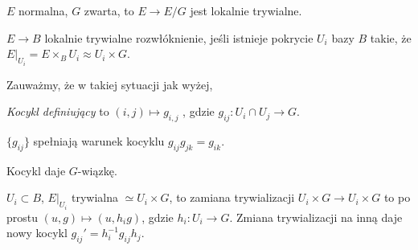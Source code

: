  \begin{twierdzeniebd}
  $E$ normalna, $G$ zwarta, to $E \to E/G$ jest lokalnie trywialne.
 \end{twierdzeniebd}
 
 \begin{definicja}
  $E \to B$ lokalnie trywialne rozwłóknienie, jeśli istnieje pokrycie $U_i$ bazy $B$ takie, że $E|_{U_i} = E \times_B U_i \approx U_i \times G$.
 \end{definicja}
 
 \begin{uwaga}
  Zauważmy, że w takiej sytuacji jak wyżej,
  

 \end{uwaga}
 
 \begin{definicja}
  \emph{Kocykl definiujący} to $(i,j) \mapsto g_{i,j}$ , gdzie $g_{ij}:U_i \cap U_j \to G$.
 \end{definicja}
 
 \begin{stwierdzenie}
  $\{g_{ij}\}$ spełniają warunek kocyklu $g_{ij} g_{jk} = g_{ik}$.
 \end{stwierdzenie}
 
 \begin{uwaga}
  Kocykl daje $G$-wiązkę.
 \end{uwaga}
 
 \begin{uwaga}
  $U_i \subset B$, $E|_{U_i}$ trywialna $\simeq U_i \times G$, to zamiana trywializacji $U_i \times G \to U_i \times G$ to po prostu $(u,g) \mapsto (u,h_i g)$, gdzie $h_i:U_i \to G$. Zmiana trywializacji na inną daje nowy kocykl $g_{ij}' = h_i^{-1} g_{ij} h_j$.
 \end{uwaga}
 
